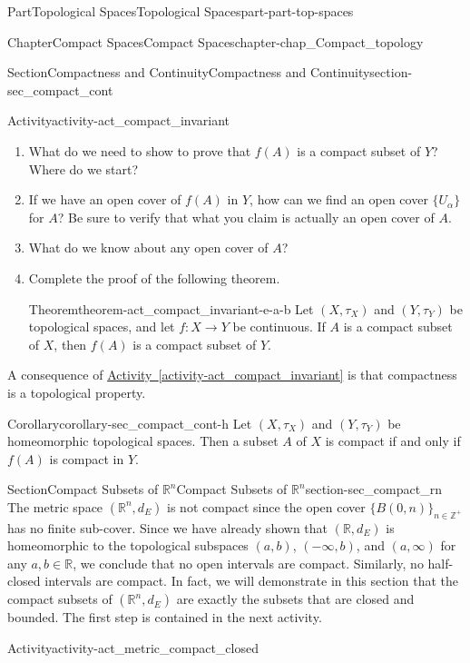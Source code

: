 \documentclass[oneside,10pt,]{book}
\newcommand{\xreffont}{\relax}
\numberwithin{equation}{chapter}
\newcommand{\Z}{\mathbb{Z}}
\newcommand{\R}{\mathbb{R}}
\begin{document}
\begin{partptx}{Part}{Topological Spaces}{}{Topological Spaces}{}{}{part-part-top-spaces}
\begin{chapterptx}{Chapter}{Compact Spaces}{}{Compact Spaces}{}{}{chapter-chap_Compact_topology}
\begin{sectionptx}{Section}{Compactness and Continuity}{}{Compactness and Continuity}{}{}{section-sec_compact_cont}
\begin{activity}{Activity}{}{activity-act_compact_invariant}
\begin{enumerate}[font=\bfseries,label=(\alph*),ref=\alph*]%
\item{}What do we need to show to prove that \(f(A)\) is a compact subset of \(Y\)? Where do we start?%
\item{}If we have an open cover of \(f(A)\) in \(Y\), how can we find an open cover \(\{U_{\alpha}\}\) for \(A\)? Be sure to verify that what you claim is actually an open cover of \(A\).%
\item{}What do we know about any open cover of \(A\)?%
\item{}Complete the proof of the following theorem.%
\begin{theorem}{Theorem}{}{}{theorem-act_compact_invariant-e-a-b}%
Let \((X, \tau_X)\) and \((Y, \tau_Y)\) be topological spaces, and let \(f: X \to Y\) be continuous. If \(A\) is a compact subset of \(X\), then \(f(A)\) is a compact subset of \(Y\).%
\end{theorem}
\end{enumerate}%
\end{activity}%
A consequence of \hyperref[activity-act_compact_invariant]{Activity~{\xreffont\ref{activity-act_compact_invariant}}} is that compactness is a topological property.%
\begin{corollary}{Corollary}{}{}{corollary-sec_compact_cont-h}%
Let \((X, \tau_X)\) and \((Y, \tau_Y)\) be homeomorphic topological spaces. Then a subset \(A\) of \(X\) is compact if and only if \(f(A)\) is compact in \(Y\).%
\end{corollary}
\end{sectionptx}
%
%
\typeout{************************************************}
\typeout{Section  Compact Subsets of \(\R^n\)}
\typeout{************************************************}
%
\begin{sectionptx}{Section}{Compact Subsets of \(\R^n\)}{}{Compact Subsets of \(\R^n\)}{}{}{section-sec_compact_rn}
The metric space \((\R^n,d_E)\) is not compact since the open cover \(\{B(0, n)\}_{n \in \Z^+}\) has no finite sub-cover. Since we have already shown that \((\R,d_E)\) is homeomorphic to the topological subspaces \((a,b)\), \((-\infty, b)\), and \((a,\infty)\) for any \(a,
b \in \R\), we conclude that no open intervals are compact. Similarly, no half-closed intervals are compact. In fact, we will demonstrate in this section that the compact subsets of \((\R^n, d_E)\) are exactly the subsets that are closed and bounded. The first step is contained in the next activity.%
\begin{activity}{Activity}{}{activity-act_metric_compact_closed}%

\end{activity}
\end{sectionptx}
\end{chapterptx}
\end{partptx}
\end{document}
